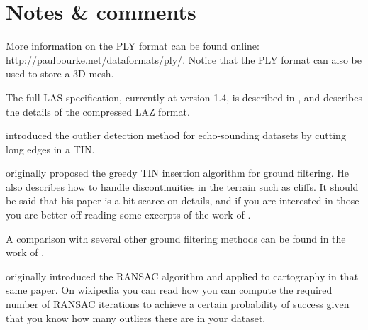 %
%
%
%
%


%
\section{Notes \& comments}
More information on the PLY format can be found online: \url{http://paulbourke.net/dataformats/ply/}. 
Notice that the PLY format can also be used to store a 3D mesh.

The full LAS specification, currently at version 1.4, is described in \citet{LAS13}, and \citet{Isenburg13} describes the details of the compressed LAZ format.

\citet{Arge10} introduced the outlier detection method for echo-sounding datasets by cutting long edges in a TIN\@.

\citet{axelsson2000generation} originally proposed the greedy TIN insertion algorithm for ground filtering.
He also describes how to handle discontinuities in the terrain such as cliffs.
It should be said that his paper is a bit scarce on details, and if you are interested in those you are better off reading some excerpts of the work of \citet{Lin14}. 

A comparison with several other ground filtering methods can be found in the work of \citet{Meng10}.

\citet{Fischler81} originally introduced the RANSAC algorithm and applied to cartography in that same paper. On wikipedia you can read how you can compute the required number of RANSAC iterations to achieve a certain probability of success given that you know how many outliers there are in your dataset.

